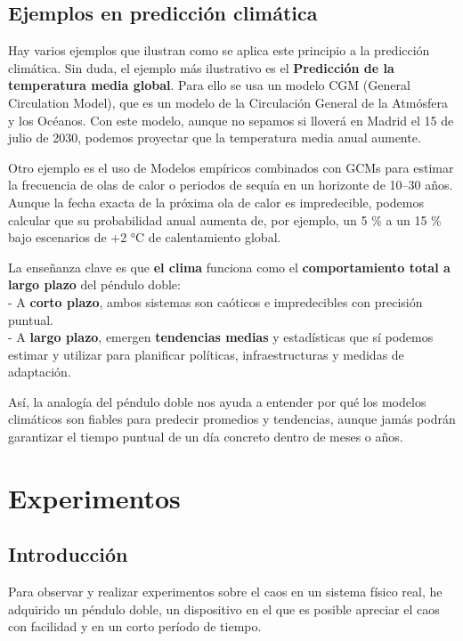 \documentclass[
  11pt,
  a4paper,
  DIV=11,
  numbers=noendperiod]{scrreprt}
\begin{document}
\section{Ejemplos en predicción
climática}\label{ejemplos-en-predicciuxf3n-climuxe1tica}

Hay varios ejemplos que ilustran como se aplica este principio a la
predicción climática. Sin duda, el ejemplo más ilustrativo es el
\textbf{Predicción de la temperatura media global}. Para ello se usa un
modelo CGM (General Circulation Model), que es un modelo de la
Circulación General de la Atmósfera y los Océanos. Con este modelo,
aunque no sepamos si lloverá en Madrid el 15 de julio de 2030, podemos
proyectar que la temperatura media anual aumente.

Otro ejemplo es el uso de Modelos empíricos combinados con GCMs para
estimar la frecuencia de olas de calor o periodos de sequía en un
horizonte de 10--30 años. Aunque la fecha exacta de la próxima ola de
calor es impredecible, podemos calcular que su probabilidad anual
aumenta de, por ejemplo, un 5 \% a un 15 \% bajo escenarios de +2 °C de
calentamiento global.

La enseñanza clave es que \textbf{el clima} funciona como el
\textbf{comportamiento total a largo plazo} del péndulo doble:\\
- A \textbf{corto plazo}, ambos sistemas son caóticos e impredecibles
con precisión puntual.\\
- A \textbf{largo plazo}, emergen \textbf{tendencias medias} y
estadísticas que sí podemos estimar y utilizar para planificar
políticas, infraestructuras y medidas de adaptación.

Así, la analogía del péndulo doble nos ayuda a entender por qué los
modelos climáticos son fiables para predecir promedios y tendencias,
aunque jamás podrán garantizar el tiempo puntual de un día concreto
dentro de meses o años.

\chapter{Experimentos}\label{experimentos}

\section{Introducción}\label{introducciuxf3n-4}

Para observar y realizar experimentos sobre el caos en un sistema físico
real, he adquirido un péndulo doble, un dispositivo en el que es posible
apreciar el caos con facilidad y en un corto período de tiempo.
\end{document}
